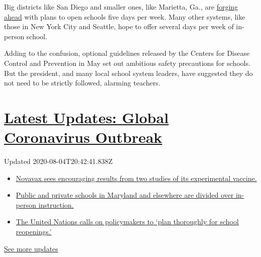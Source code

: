 Big districts like San Diego and smaller ones, like Marietta, Ga., are
\href{https://www.nytimes.com/2020/07/09/us/schools-reopening-trump.html}{forging
ahead} with plans to open schools five days per week. Many other
systems, like those in New York City and Seattle, hope to offer several
days per week of in-person school.

Adding to the confusion, optional guidelines released by the Centers for
Disease Control and Prevention in May set out ambitious safety
precautions for schools. But the president, and many local school system
leaders, have suggested they do not need to be strictly followed,
alarming teachers.

\hypertarget{latest-updates-global-coronavirus-outbreak}{%
\section{\texorpdfstring{\href{https://www.nytimes.com/2020/08/04/world/coronavirus-cases.html?action=click\&pgtype=Article\&state=default\&region=MAIN_CONTENT_1\&context=storylines_live_updates}{Latest
Updates: Global Coronavirus
Outbreak}}{Latest Updates: Global Coronavirus Outbreak}}\label{latest-updates-global-coronavirus-outbreak}}

Updated 2020-08-04T20:42:41.838Z

\begin{itemize}
\tightlist
\item
  \href{https://www.nytimes.com/2020/08/04/world/coronavirus-cases.html?action=click\&pgtype=Article\&state=default\&region=MAIN_CONTENT_1\&context=storylines_live_updates\#link-1228a480}{Novavax
  sees encouraging results from two studies of its experimental
  vaccine.}
\item
  \href{https://www.nytimes.com/2020/08/04/world/coronavirus-cases.html?action=click\&pgtype=Article\&state=default\&region=MAIN_CONTENT_1\&context=storylines_live_updates\#link-4825b93}{Public
  and private schools in Maryland and elsewhere are divided over
  in-person instruction.}
\item
  \href{https://www.nytimes.com/2020/08/04/world/coronavirus-cases.html?action=click\&pgtype=Article\&state=default\&region=MAIN_CONTENT_1\&context=storylines_live_updates\#link-50f7386d}{The
  United Nations calls on policymakers to `plan thoroughly for school
  reopenings.'}
\end{itemize}

\href{https://www.nytimes.com/2020/08/04/world/coronavirus-cases.html?action=click\&pgtype=Article\&state=default\&region=MAIN_CONTENT_1\&context=storylines_live_updates}{See
more updates}

